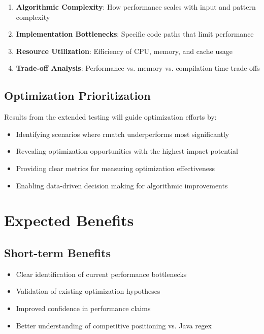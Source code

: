 \documentclass[11pt,a4paper]{article}
\begin{document}
\begin{enumerate}
    \item \textbf{Algorithmic Complexity}: How performance scales with input and pattern complexity
    \item \textbf{Implementation Bottlenecks}: Specific code paths that limit performance
    \item \textbf{Resource Utilization}: Efficiency of CPU, memory, and cache usage
    \item \textbf{Trade-off Analysis}: Performance vs. memory vs. compilation time trade-offs
\end{enumerate}

\subsection{Optimization Prioritization}

Results from the extended testing will guide optimization efforts by:

\begin{itemize}
    \item Identifying scenarios where rmatch underperforms most significantly
    \item Revealing optimization opportunities with the highest impact potential
    \item Providing clear metrics for measuring optimization effectiveness
    \item Enabling data-driven decision making for algorithmic improvements
\end{itemize}

\section{Expected Benefits}

\subsection{Short-term Benefits}

\begin{itemize}
    \item Clear identification of current performance bottlenecks
    \item Validation of existing optimization hypotheses
    \item Improved confidence in performance claims
    \item Better understanding of competitive positioning vs. Java regex
\end{itemize}
\end{document}
